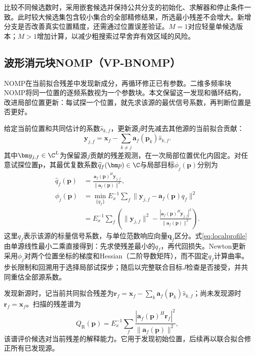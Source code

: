 比较不同候选数时，采用嵌套候选并保持公共分支的初始化、求解器和停止条件一致。此时较大候选集包含较小集合的全部精修结果，所选最小残差不会增大。新增分支是否改善真实位置精度，还需通过位置误差验证。$M=1$对应轻量单候选版本；$M>1$增加计算，以减少粗搜索过早舍弃有效区域的风险。

\subsection{波形消元块NOMP（VP-BNOMP）}\label{sec:vpnomp}
NOMP在当前拟合残差中发现新成分，再循环修正已有参数\cite{Mamandipoor2016}。二维多频率块NOMP将同一位置的逐频系数视为一个参数块\cite{Yang2022}。本文保留这一发现和循环结构，改进局部位置更新：每试探一个位置，就先求该源的最优信号系数，再判断位置是否更好。

给定当前位置和共同估计的系数$\widehat s_{k,f}$，更新源$j$时先减去其他源的当前拟合贡献：
\begin{equation}
 \bm y_{j,f}=\bm x_f-\sum_{k\ne j}\bm a_f(\bm p_k)\widehat s_{k,f} .
 \label{eq:targetResidual}
\end{equation}
其中$\bm y_{j,f}\in\C^L$为保留源$j$贡献的残差观测，在一次局部位置优化内固定。对任意试探位置$\bm p$，其最优复数系数$\widehat q_f(\bm p)\in\C$与局部目标$\phi_j(\bm p)$分别为
\begin{align}
 \widehat q_f(\bm p)&=\frac{\bm a_f(\bm p)^H\bm y_{j,f}}
 {\|\bm a_f(\bm p)\|^2},\label{eq:localcoef}\\
 \phi_j(\bm p)&=\min_{\{q_f\}}E_x^{-1}\sum_f
 \|\bm y_{j,f}-\bm a_f(\bm p)q_f\|^2\nonumber\\
 &=E_x^{-1}\sum_f\left(\|\bm y_{j,f}\|^2-
 \frac{|\bm a_f(\bm p)^H\bm y_{j,f}|^2}{\|\bm a_f(\bm p)\|^2}\right).
 \label{eq:localprofile}
\end{align}
这里$q_f$表示该源的标量信号系数，与单位范数响应向量$\bm q_f$区分。式\eqref{eq:localprofile}由单源线性最小二乘直接得到：先求使残差最小的$q_f$，再代回损失。Newton更新采用$\phi_j$对两个位置坐标的梯度和Hessian（二阶导数矩阵），而不固定$q_f$计算曲率。步长限制和回溯用于选择局部试探步；随后以完整联合目标$J$检查是否接受，并共同重估全部源系数。

发现新源时，记当前共同拟合残差为$\bm r_f=\bm x_f-\sum_k\bm a_f(\bm p_k)\widehat s_{k,f}$；尚未发现源时$\bm r_f=\bm x_f$。扫描的残差谱为
\begin{equation}
 Q_{\mathrm R}(\bm p)=E_x^{-1}\sum_f
 \frac{|\bm a_f(\bm p)^H\bm r_f|^2}{\|\bm a_f(\bm p)\|^2},
 \label{eq:residualScore}
\end{equation}
该谱评价候选对当前残差的解释能力。它用于发现初始位置，后续再以联合拟合修正所有已发现源。

